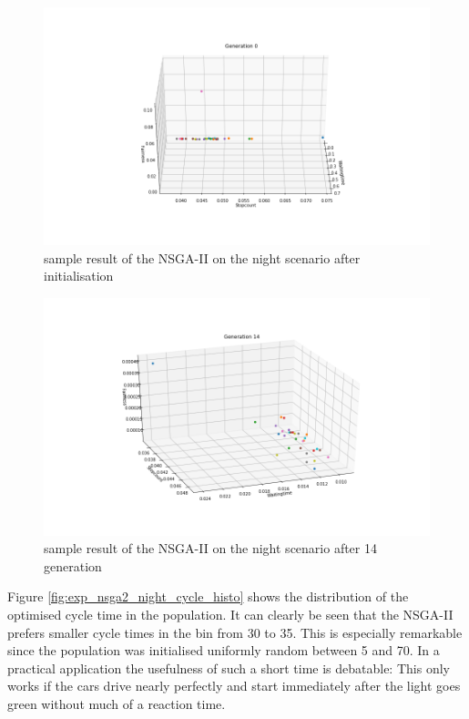 \documentclass[./\jobname.tex]{subfiles}
\begin{document}
\begin{figure}[H]
	\centering
	\includegraphics[width=\textwidth]{../img/png/nsga2_night_0.png}
	\caption{sample result of the NSGA-II on the night scenario after initialisation}
	\label{fig:exp_nsga2_night_result_g0}
\end{figure}


\begin{figure}[H]
	\centering
	\includegraphics[width=\textwidth]{../img/png/nsga2_night_14.png}
	\caption{sample result of the NSGA-II on the night scenario after 14 generation}
	\label{fig:exp_nsga2_night_result_g14}
\end{figure}

\newpage

Figure \ref{fig:exp_nsga2_night_cycle_histo} shows the distribution of the optimised cycle time in the population. It can clearly be seen that the NSGA-II prefers smaller cycle times in the bin from 30 to 35. This is especially remarkable since the population was initialised uniformly random between 5 and 70. In a practical application the usefulness of such a short time is debatable: This only works if the cars drive nearly perfectly and start immediately after the light goes green without much of a reaction time.  
\end{document}
